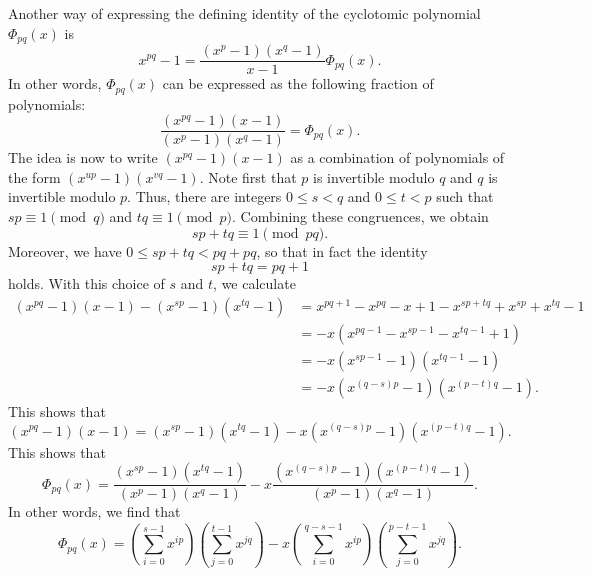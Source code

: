 \begin{example}
  Another way of expressing the defining identity of the cyclotomic polynomial $\Phi_{pq}(x)$ is
  \begin{equation*}
    x^{pq}-1=\frac{(x^p-1)(x^q-1)}{x-1}\Phi_{pq}(x).
  \end{equation*}
  In other words, $\Phi_{pq}(x)$ can be expressed as the following fraction of polynomials:
  \begin{equation*}
    \frac{(x^{pq}-1)(x-1)}{(x^p-1)(x^q-1)}=\Phi_{pq}(x).
  \end{equation*}
  The idea is now to write $(x^{pq}-1)(x-1)$ as a combination of polynomials of the form $(x^{up}-1)(x^{vq}-1)$.
  Note first that $p$ is invertible modulo $q$ and $q$ is invertible modulo $p$. Thus, there are integers $0\leq s<q$ and $0\leq t<p$ such that $sp\equiv 1\pmod{q}$ and $tq\equiv 1\pmod{p}$. Combining these congruences, we obtain
  \begin{equation*}
    sp+tq\equiv 1\pmod{pq}.
  \end{equation*}
  Moreover, we have $0\leq sp+tq<pq+pq$, so that in fact the identity
  \begin{equation*}
    sp+tq=pq+1
  \end{equation*}
  holds. With this choice of $s$ and $t$, we calculate
  \begin{align*}
    (x^{pq}-1)(x-1)-(x^{sp}-1)(x^{tq}-1)
    & =x^{pq+1}-x^{pq}-x+1-x^{sp+tq}+x^{sp}+x^{tq}-1 \\
    & = -x(x^{pq-1}-x^{sp-1}-x^{tq-1}+1) \\
    & = -x(x^{sp-1}-1)(x^{tq-1}-1) \\
    & = -x(x^{(q-s)p}-1)(x^{(p-t)q}-1).
  \end{align*}
  This shows that
  \begin{equation*}
    (x^{pq}-1)(x-1)=(x^{sp}-1)(x^{tq}-1)-x(x^{(q-s)p}-1)(x^{(p-t)q}-1).
  \end{equation*}
  This shows that
  \begin{equation*}
    \Phi_{pq}(x)=\frac{(x^{sp}-1)(x^{tq}-1)}{(x^p-1)(x^q-1)}-x\frac{(x^{(q-s)p}-1)(x^{(p-t)q}-1)}{(x^p-1)(x^q-1)}.
  \end{equation*}
  In other words, we find that
  \begin{equation*}
    \Phi_{pq}(x)=\left(\sum_{i=0}^{s-1}x^{ip}\right)\left(\sum_{j=0}^{t-1}x^{jq}\right)-x\left(\sum_{i=0}^{q-s-1}x^{ip}\right)\left(\sum_{j=0}^{p-t-1}x^{jq}\right).
  \end{equation*}
\end{example}


